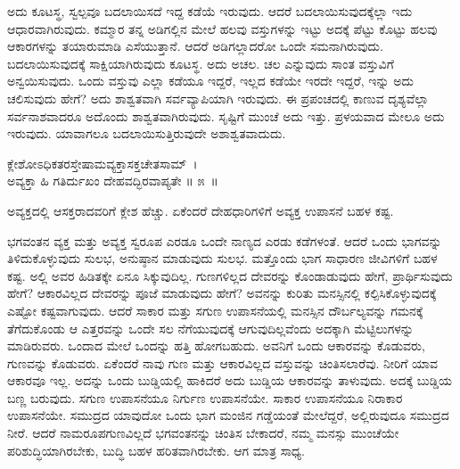 ಅದು ಕೂಟಸ್ಥ, ಸ್ವಲ್ಪವೂ ಬದಲಾಯಿಸದೆ ಇದ್ದ ಕಡೆಯೆ ಇರುವುದು. ಆದರೆ ಬದಲಾಯಿ\-ಸುವು\-ದಕ್ಕೆಲ್ಲಾ ಇದು ಆಧಾರವಾಗಿರುವುದು. ಕಮ್ಮಾರ ತನ್ನ ಅಡಿಗಲ್ಲಿನ ಮೇಲೆ ಹಲವು ವಸ್ತುಗಳನ್ನು ಇಟ್ಟು ಅದಕ್ಕೆ ಪೆಟ್ಟು ಕೊಟ್ಟು ಹಲವು ಆಕಾರಗಳನ್ನು ತಯಾರುಮಾಡಿ ಎಸೆಯುತ್ತಾನೆ. ಆದರೆ ಅಡಿಗಲ್ಲಾದರೋ ಒಂದೇ ಸಮನಾಗಿರುವುದು. ಬದಲಾಯಿಸುವುದಕ್ಕೆ ಸಾಕ್ಷಿಯಾಗಿರುವುದು ಕೂಟಸ್ಥ. ಅದು ಅಚಲ. ಚಲ ಎನ್ನುವುದು ಸಾಂತ ವಸ್ತುವಿಗೆ ಅನ್ವಯಿಸುವುದು. ಒಂದು ವಸ್ತುವು ಎಲ್ಲಾ ಕಡೆಯೂ ಇದ್ದರೆ, ಇಲ್ಲದ ಕಡೆಯೇ ಇರದೇ ಇದ್ದರೆ, ಇನ್ನು ಅದು ಚಲಿಸುವುದು ಹೇಗೆ? ಅದು ಶಾಶ್ವತವಾಗಿ ಸರ್ವವ್ಯಾಪಿಯಾಗಿ ಇರುವುದು. ಈ ಪ್ರಪಂಚದಲ್ಲಿ ಕಾಣುವ ದೃಶ್ಯವೆಲ್ಲಾ ಸರ್ವನಾಶವಾದರೂ ಅದೊಂದು ಶಾಶ್ವತವಾಗಿರುವುದು. ಸೃಷ್ಟಿಗೆ ಮುಂಚೆ ಅದು ಇತ್ತು. ಪ್ರಳಯವಾದ ಮೇಲೂ ಅದು ಇರುವುದು. ಯಾವಾಗಲೂ ಬದಲಾಯಿಸುತ್ತಿರುವುದೇ ಅಶಾಶ್ವತವಾದುದು.

\begin{shloka}
ಕ್ಲೇಶೋಽಧಿಕತರಸ್ತೇಷಾಮವ್ಯಕ್ತಾಸಕ್ತಚೇತಸಾಮ್~।\\ಅವ್ಯಕ್ತಾ ಹಿ ಗತಿರ್ದುಖಂ ದೇಹವದ್ಭಿರವಾಪ್ಯತೇ \hfill॥ ೫~॥
\end{shloka}

\begin{artha}
ಅವ್ಯಕ್ತದಲ್ಲಿ ಆಸಕ್ತರಾದವರಿಗೆ ಕ್ಲೇಶ ಹೆಚ್ಚು. ಏಕೆಂದರೆ ದೇಹಧಾರಿಗಳಿಗೆ ಅವ್ಯಕ್ತ ಉಪಾಸನೆ ಬಹಳ ಕಷ್ಟ.
\end{artha}

ಭಗವಂತನ ವ್ಯಕ್ತ ಮತ್ತು ಅವ್ಯಕ್ತ ಸ್ವರೂಪ ಎರಡೂ ಒಂದೇ ನಾಣ್ಯದ ಎರಡು ಕಡೆಗಳಂತೆ. ಆದರೆ ಒಂದು ಭಾಗವನ್ನು ತಿಳಿದುಕೊಳ್ಳುವುದು ಸುಲಭ, ಅನುಷ್ಠಾನ ಮಾಡುವುದು ಸುಲಭ. ಮತ್ತೊಂದು ಭಾಗ ಸಾಧಾರಣ ಜೀವಿಗಳಿಗೆ ಬಹಳ ಕಷ್ಟ. ಅಲ್ಲಿ ಅವರ ಹಿಡಿತಕ್ಕೇ ಏನೂ ಸಿಕ್ಕುವುದಿಲ್ಲ. ಗುಣಗಳಿಲ್ಲದ ದೇವರನ್ನು ಕೊಂಡಾಡುವುದು ಹೇಗೆ, ಪ್ರಾರ್ಥಿಸುವುದು ಹೇಗೆ? ಆಕಾರವಿಲ್ಲದ ದೇವರನ್ನು ಪೂಜೆ ಮಾಡುವುದು ಹೇಗೆ? ಅವನನ್ನು ಕುರಿತು ಮನಸ್ಸಿನಲ್ಲಿ ಕಲ್ಪಿಸಿಕೊಳ್ಳುವುದಕ್ಕೆ ಎಷ್ಟೋ ಕಷ್ಟವಾಗುವುದು. ಆದರೆ ಸಾಕಾರ ಮತ್ತು ಸಗುಣ ಉಪಾಸನೆಯಲ್ಲಿ ಮನಸ್ಸಿನ ದೌರ್ಬಲ್ಯವನ್ನು ಗಮನಕ್ಕೆ ತೆಗೆದುಕೊಂಡು ಆ ಎತ್ತರವನ್ನು ಒಂದೇ ಸಲ ನೆಗೆಯುವುದಕ್ಕೆ ಆಗುವುದಿಲ್ಲವೆಂದು ಅದಕ್ಕಾಗಿ ಮೆಟ್ಟಿಲುಗಳನ್ನು ಮಾಡಿರುವರು. ಒಂದಾದ ಮೇಲೆ ಒಂದನ್ನು ಹತ್ತಿ ಹೋಗಬಹುದು. ಅವನಿಗೆ ಒಂದು ಆಕಾರವನ್ನು ಕೊಡುವರು, ಗುಣವನ್ನು ಕೊಡುವರು. ಏಕೆಂದರೆ ನಾವು ಗುಣ ಮತ್ತು ಆಕಾರವಿಲ್ಲದ ವಸ್ತುವನ್ನು ಚಿಂತಿಸಲಾರೆವು. ನೀರಿಗೆ ಯಾವ ಆಕಾರವೂ ಇಲ್ಲ. ಅದನ್ನು ಒಂದು ಬುಡ್ಡಿಯಲ್ಲಿ ಹಾಕಿದರೆ ಅದು ಬುಡ್ಡಿಯ ಆಕಾರವನ್ನು ತಾಳುವುದು. ಅದಕ್ಕೆ ಬುಡ್ಡಿಯ ಬಣ್ಣ ಬರುವುದು. ಸಗುಣ ಉಪಾಸನೆಯೂ ನಿರ್ಗುಣ ಉಪಾಸನೆಯೇ. ಸಾಕಾರ ಉಪಾಸನೆಯೂ ನಿರಾಕಾರ ಉಪಾಸನೆಯೇ. ಸಮುದ್ರದ ಯಾವುದೋ ಒಂದು ಭಾಗ ಮಂಜಿನ ಗಡ್ಡೆಯಂತೆ ಮೇಲೆದ್ದರೆ, ಅಲ್ಲಿರುವುದೂ ಸಮುದ್ರದ ನೀರೆ. ಆದರೆ ನಾಮರೂಪಗುಣವಿಲ್ಲದೆ ಭಗವಂತನನ್ನು ಚಿಂತಿಸ ಬೇಕಾದರೆ, ನಮ್ಮ ಮನಸ್ಸು ಮುಂಚೆಯೇ ಪರಿಶುದ್ಧಿಯಾಗಿರಬೇಕು, ಬುದ್ಧಿ ಬಹಳ ಹರಿತವಾಗಿರಬೇಕು. ಆಗ ಮಾತ್ರ ಸಾಧ್ಯ.

